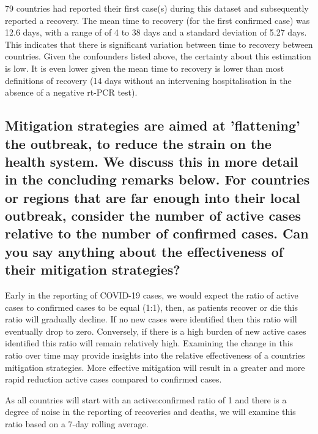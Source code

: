\documentclass[8pt]{article}
\begin{document}
        79 countries had reported their first case(s) during this dataset and subsequently reported a recovery. The mean time to recovery (for the first confirmed case) was 12.6 days, with a range of of 4 to 38 days and a standard deviation of 5.27 days. This indicates that there is significant variation between time to recovery between countries. Given the confounders listed above, the certainty about this estimation is low. It is even lower given the mean time to recovery is lower than most definitions of recovery (14 days without an intervening hospitalisation in the absence of a negative rt-PCR test).
    \subsection{Mitigation strategies are aimed at 'flattening' the outbreak, to reduce the strain on the health system. We discuss this in more detail in the concluding remarks below. For countries or regions that are far enough into their local outbreak, consider the number of active cases relative to the number of confirmed cases. Can you say anything about the effectiveness of their mitigation strategies?}
Early in the reporting of COVID-19 cases, we would expect the ratio of active cases to confirmed cases to be equal (1:1), then, as patients recover or die this ratio will gradually decline. If no new cases were identified then this ratio will eventually drop to zero. Conversely, if there is a high burden of new active cases identified this ratio will remain relatively high. Examining the change in this ratio over time may provide insights into the relative effectiveness of a countries mitigation strategies. More effective mitigation will result in a greater and more rapid reduction active cases compared to confirmed cases.


As all countries will start with an active:confirmed ratio of 1 and there is a degree of noise in the reporting of recoveries and deaths, we will examine this ratio based on a 7-day rolling average.
\end{document}
